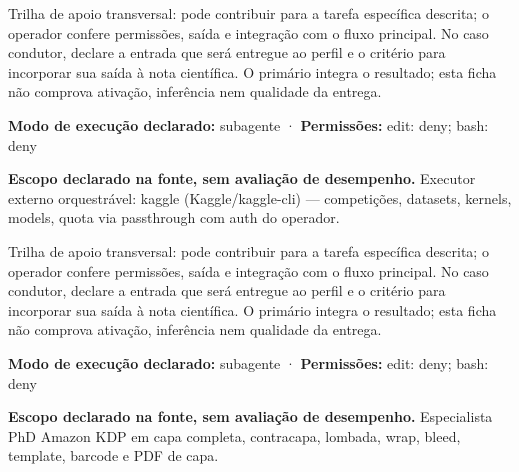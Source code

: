 \begin{funcao}
Trilha de apoio transversal: pode contribuir para a tarefa específica descrita; o operador confere permissões, saída e integração com o fluxo principal. No caso condutor, declare a entrada que será entregue ao perfil e o critério para incorporar sua saída à nota científica. O primário integra o resultado; esta ficha não comprova ativação, inferência nem qualidade da entrega.
\end{funcao}

\begin{arquitetura}
\textbf{Modo de execução declarado:} subagente · \textbf{Permissões:} edit: deny; bash: deny
\end{arquitetura}


\begin{descricao}
\textbf{Escopo declarado na fonte, sem avaliação de desempenho.}
Executor externo orquestrável: kaggle (Kaggle/kaggle-cli) — competições, datasets, kernels, models, quota via passthrough com auth do operador.
\end{descricao}

\begin{funcao}
Trilha de apoio transversal: pode contribuir para a tarefa específica descrita; o operador confere permissões, saída e integração com o fluxo principal. No caso condutor, declare a entrada que será entregue ao perfil e o critério para incorporar sua saída à nota científica. O primário integra o resultado; esta ficha não comprova ativação, inferência nem qualidade da entrega.
\end{funcao}

\begin{arquitetura}
\textbf{Modo de execução declarado:} subagente · \textbf{Permissões:} edit: deny; bash: deny
\end{arquitetura}


\begin{descricao}
\textbf{Escopo declarado na fonte, sem avaliação de desempenho.}
Especialista PhD Amazon KDP em capa completa, contracapa, lombada, wrap, bleed, template, barcode e PDF de capa.
\end{descricao}

